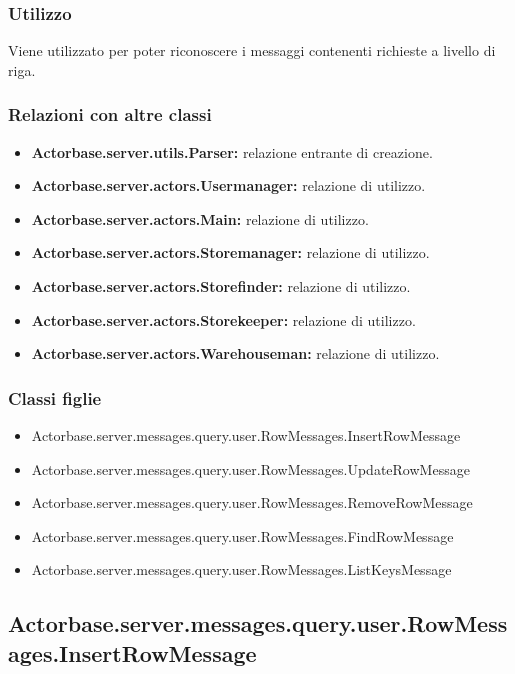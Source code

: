 \documentclass[a4paper]{article}
\begin{document}
			\subsubsection{Utilizzo}
				Viene utilizzato per poter riconoscere i messaggi contenenti richieste a livello di riga.
			\subsubsection{Relazioni con altre classi}
				\begin{itemize}
					\item \textbf{Actorbase.server.utils.Parser:} relazione entrante di creazione.
					\item \textbf{Actorbase.server.actors.Usermanager:} relazione di utilizzo.
					\item \textbf{Actorbase.server.actors.Main:} relazione di utilizzo.
					\item \textbf{Actorbase.server.actors.Storemanager:} relazione di utilizzo.
					\item \textbf{Actorbase.server.actors.Storefinder:} relazione di utilizzo.
					\item \textbf{Actorbase.server.actors.Storekeeper:} relazione di utilizzo.
					\item \textbf{Actorbase.server.actors.Warehouseman:} relazione di utilizzo.
				\end{itemize}
			\subsubsection{Classi figlie}
				\begin{itemize}
					\item Actorbase.server.messages.query.user.RowMessages.InsertRowMessage
					\item Actorbase.server.messages.query.user.RowMessages.UpdateRowMessage
					\item Actorbase.server.messages.query.user.RowMessages.RemoveRowMessage
					\item Actorbase.server.messages.query.user.RowMessages.FindRowMessage
					\item Actorbase.server.messages.query.user.RowMessages.ListKeysMessage
				\end{itemize}
		
		\subsection{Actorbase.server.messages.query.user.RowMessages.InsertRowMessage}
\end{document}
